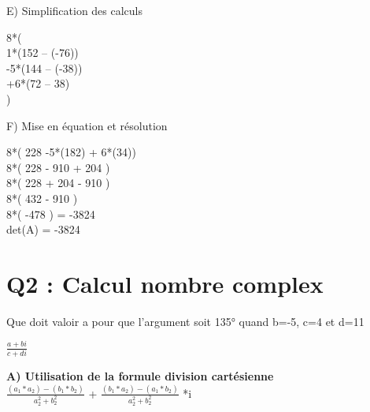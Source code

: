 E) Simplification des calculs

\vspace{5mm} %

8*(\\

  1*(152 – (-76))\\

  -5*(144 – (-38))\\

  +6*(72 – 38)\\

)

\vspace{10mm} %


F) Mise en équation et résolution \\

\vspace{5mm} %

8*( 228 -5*(182) + 6*(34))\\

8*( 228 - 910 + 204 )\\

8*( 228 + 204 - 910 )\\

8*( 432 - 910 )\\

8*( -478 ) = -3824\\

det(A) = -3824\\


\newpage

\section{Q2 : Calcul nombre complex}

\vspace{4mm} %

Que doit valoir a pour que l’argument soit 135° quand b=-5, c=4 et d=11 \\

\vspace{4mm} %

$\frac{a+bi}{c+di}$

\vspace{10mm} %

\textbf{A) Utilisation de la formule division cartésienne} \\

$\frac{(a_1 * a_2) - (b_1*b_2)} {a_{2}^{2}+b_{2}^{2} } $ + $\frac{(b_1 * a_2) - (a_1*b_2)} {a_{2}^{2}+b_{2}^{2} } $ *i \\

